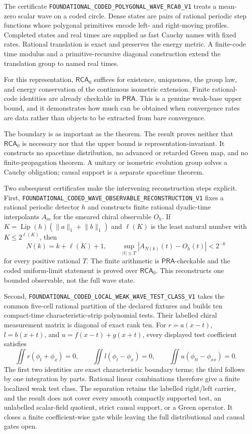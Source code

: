 \documentclass[11pt]{article}
\theoremstyle{definition}
\theoremstyle{remark}
\newcommand{\RCA}{\mathsf{RCA}_{0}}
\newcommand{\PRA}{\mathsf{PRA}}
\newcommand{\cert}[1]{\nolinkurl{#1}}
\begin{document}
The certificate
\cert{FOUNDATIONAL_CODED_POLYGONAL_WAVE_RCA0_V1} treats a mean-zero scalar
wave on a coded circle.  Dense states are pairs of rational periodic step
functions whose polygonal primitives encode left- and right-moving profiles.
Completed states and real times are supplied as fast Cauchy names with fixed
rates.  Rational translation is exact and preserves the energy metric.  A
finite-code time modulus and a primitive-recursive diagonal construction
extend the translation group to named real times.

For this representation, \(\RCA\) suffices for existence, uniqueness, the
group law, and energy conservation of the continuous isometric extension.
Finite rational-code identities are already checkable in \(\PRA\).  This is a
genuine weak-base upper bound, and it demonstrates how much can be obtained
when convergence rates are data rather than objects to be extracted from bare
convergence.

The boundary is as important as the theorem.  The result proves neither that
\(\RCA\) is necessary nor that the upper bound is representation-invariant.
It constructs no spacetime distribution, no advanced or retarded Green map,
and no finite-propagation theorem.  A unitary or isometric evolution group
solves a Cauchy obligation; causal support is a separate spacetime theorem.

Two subsequent certificates make the intervening reconstruction steps
explicit.  First,
\cert{FOUNDATIONAL_CODED_WAVE_OBSERVABLE_RECONSTRUCTION_V1} fixes a rational
periodic detector \(h\) and constructs finite rational dyadic-time
interpolants \(A_m\) for the smeared chiral observable \(O_h\).  If
\(K=\operatorname{Lip}(h)(\lVert a\rVert_1+\lVert b\rVert_1)\) and
\(\ell(K)\) is the least natural number with \(K\leq2^{\ell(K)}\), then
\[
 N(k)=k+\ell(K)+1,
 \qquad
 \sup_{|t|\leq T}|A_{N(k)}(t)-O_h(t)|<2^{-k}
\]
for every positive rational \(T\).  The finite arithmetic is
\(\PRA\)-checkable and the coded uniform-limit statement is proved over
\(\RCA\).
This reconstructs one bounded observable, not the full wave state.

Second, \cert{FOUNDATIONAL_CODED_LOCAL_WEAK_WAVE_TEST_CLASS_V1} takes the
common five-cell rational partition of the declared fixtures and builds ten
compact-time characteristic-strip polynomial tests.  Their labelled chiral
measurement matrix is diagonal of exact rank ten.  For
\(r=a(x-t)\), \(l=b(x+t)\), and
\(u=f(x-t)+g(x+t)\), every displayed test coefficient satisfies
\[
 \iint r(\phi_t+\phi_x)=0,
 \qquad
 \iint l(\phi_t-\phi_x)=0,
 \qquad
 \iint u(\phi_{tt}-\phi_{xx})=0.
\]
The first two identities are exact characteristic boundary terms; the third
follows by one integration by parts.  Rational linear combinations therefore
give a finite localized weak test class.  The separation retains the labelled
right/left carrier, and the result does not cover every smooth compactly
supported test, an unlabelled scalar-field quotient, strict causal support, or
a Green operator.  It closes a finite coefficient-wise gate while leaving the
full distributional and causal gates open.
\end{document}
